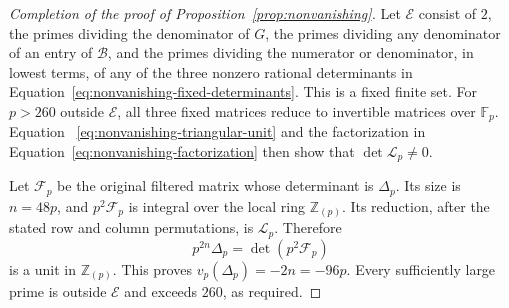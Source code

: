 \begin{proof}[Completion of the proof of Proposition~\ref{prop:nonvanishing}]
Let $\mathcal E$ consist of $2$, the primes dividing the denominator of
$G$, the primes dividing any denominator of an entry of $\mathcal B$,
and the primes dividing the numerator or denominator, in lowest terms,
of any of the three nonzero rational determinants in
Equation~\eqref{eq:nonvanishing-fixed-determinants}. This is a fixed
finite set. For $p>260$ outside $\mathcal E$, all three fixed matrices
reduce to invertible matrices over $\mathbb F_p$. Equation~
\eqref{eq:nonvanishing-triangular-unit} and the factorization in
Equation~\eqref{eq:nonvanishing-factorization} then show that
$\det\mathcal L_p\ne0$.

Let $\mathcal F_p$ be the original filtered matrix whose determinant is
$\Delta_p$. Its size is $n=48p$, and $p^2\mathcal F_p$ is integral
over the local ring $\mathbb Z_{(p)}$. Its reduction, after the stated
row and column permutations, is $\mathcal L_p$. Therefore
\[
 p^{2n}\Delta_p=\det(p^2\mathcal F_p)
\]
is a unit in $\mathbb Z_{(p)}$. This proves
$v_p(\Delta_p)=-2n=-96p$. Every sufficiently large prime is outside
$\mathcal E$ and exceeds $260$, as required.
\end{proof}
